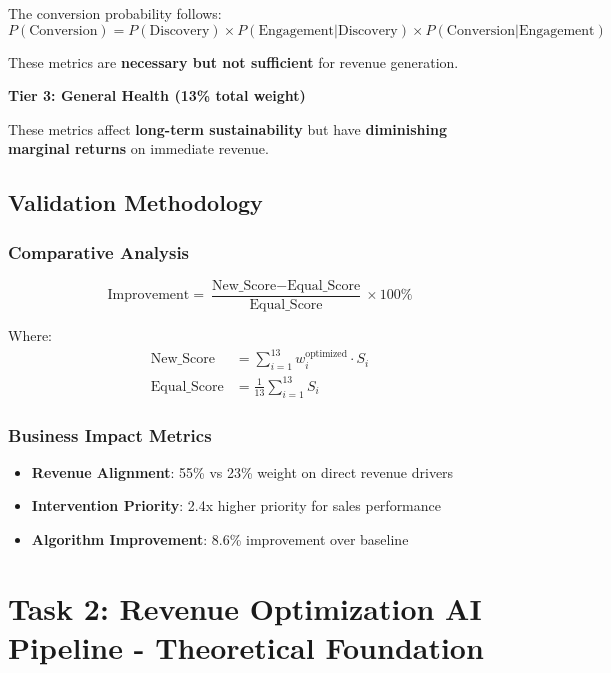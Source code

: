 \documentclass[12pt,a4paper]{article}
\begin{document}
The conversion probability follows:
\begin{equation}
P(\text{Conversion}) = P(\text{Discovery}) \times P(\text{Engagement}|\text{Discovery}) \times P(\text{Conversion}|\text{Engagement})
\end{equation}

These metrics are \textbf{necessary but not sufficient} for revenue generation.

\textbf{Tier 3: General Health (13\% total weight)}

These metrics affect \textbf{long-term sustainability} but have \textbf{diminishing marginal returns} on immediate revenue.

\subsection{Validation Methodology}

\subsubsection{Comparative Analysis}

\begin{equation}
\text{Improvement} = \frac{\text{New\_Score} - \text{Equal\_Score}}{\text{Equal\_Score}} \times 100\%
\end{equation}

Where:
\begin{align}
\text{New\_Score} &= \sum_{i=1}^{13} w_i^{\text{optimized}} \cdot S_i \\
\text{Equal\_Score} &= \frac{1}{13} \sum_{i=1}^{13} S_i
\end{align}

\subsubsection{Business Impact Metrics}

\begin{itemize}
\item \textbf{Revenue Alignment}: 55\% vs 23\% weight on direct revenue drivers
\item \textbf{Intervention Priority}: 2.4x higher priority for sales performance
\item \textbf{Algorithm Improvement}: 8.6\% improvement over baseline
\end{itemize}

\section{Task 2: Revenue Optimization AI Pipeline - Theoretical Foundation}
\end{document}
